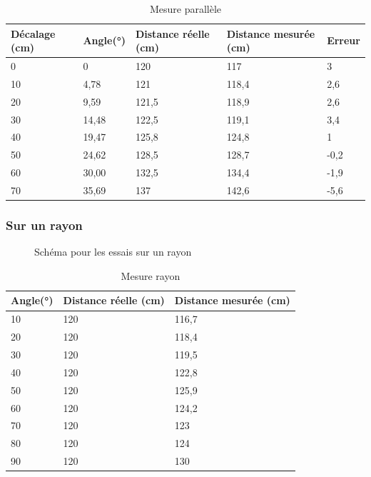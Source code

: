 \documentclass[11pt,a4paper]{article}
\begin{document}
\begin{table}[H]
    \centering
    \begin{tabular}{|l|l|l|l|l|}
    \hline
        Décalage (cm) & Angle(°) & Distance réelle (cm) & Distance mesurée (cm) & Erreur  \\ \hline
        0 & 0 & 120 & 117 & 3 \\ \hline
        10 & 4,78 & 121 & 118,4 & 2,6 \\ \hline
        20 & 9,59 & 121,5 & 118,9 & 2,6 \\ \hline
        30 & 14,48 & 122,5 & 119,1 & 3,4 \\ \hline
        40 & 19,47 & 125,8 & 124,8 & 1 \\ \hline
        50 & 24,62 & 128,5 & 128,7 & -0,2 \\ \hline
        60 & 30,00 & 132,5 & 134,4 & -1,9 \\ \hline
        70 & 35,69 & 137 & 142,6 & -5,6 \\ \hline
    \end{tabular}
    \caption{Mesure parallèle}
\end{table}

\subsubsection{Sur un rayon}
\begin{figure}[H]
  \centering
  \Schemarayon
  \caption{Schéma pour les essais sur un rayon}
\end{figure}

\begin{table}[H]
    \centering
    \begin{tabular}{|l|l|l|}
    \hline
        Angle(°) & Distance réelle (cm) & Distance mesurée (cm) \\ \hline
        10 & 120 & 116,7 \\ \hline
        20 & 120 & 118,4 \\ \hline
        30 & 120 & 119,5 \\ \hline
        40 & 120 & 122,8 \\ \hline
        50 & 120 & 125,9 \\ \hline
        60 & 120 & 124,2 \\ \hline
        70 & 120 & 123 \\ \hline
        80 & 120 & 124 \\ \hline
        90 & 120 & 130 \\ \hline
    \end{tabular}
    \caption{Mesure rayon}
\end{table}
\end{document}
